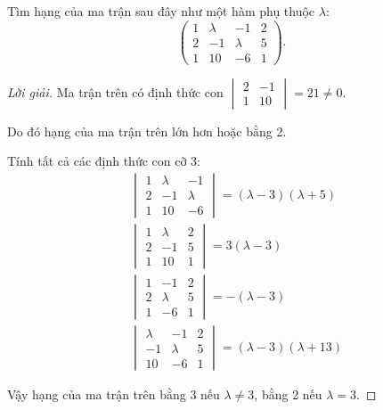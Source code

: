 \documentclass[class=linearalgebra,crop=false]{standalone}
\begin{document}
\begin{exercise}
    \par Tìm hạng của ma trận sau đây như một hàm phụ thuộc $\lambda$:
    \[
        \begin{pmatrix}
            1 & \lambda & -1      & 2 \\
            2 & -1      & \lambda & 5 \\
            1 & 10      & -6      & 1
        \end{pmatrix}.
    \]
\end{exercise}

\begin{proof}[Lời giải]
    \par Ma trận trên có định thức con $\begin{vmatrix}2 & -1 \\ 1 & 10\end{vmatrix} = 21 \ne 0$.
    \par Do đó hạng của ma trận trên lớn hơn hoặc bằng 2.
    \par Tính tất cả các định thức con cỡ 3:
    \begin{align*}
         & \begin{vmatrix}
               1 & \lambda & -1      \\
               2 & -1      & \lambda \\
               1 & 10      & -6
           \end{vmatrix} = (\lambda - 3)(\lambda + 5)  \\
         & \begin{vmatrix}
               1 & \lambda & 2 \\
               2 & -1      & 5 \\
               1 & 10      & 1
           \end{vmatrix} = 3(\lambda - 3)              \\
         & \begin{vmatrix}
               1 & -1      & 2 \\
               2 & \lambda & 5 \\
               1 & -6      & 1
           \end{vmatrix} = -(\lambda - 3)              \\
         & \begin{vmatrix}
               \lambda & -1      & 2 \\
               -1      & \lambda & 5 \\
               10      & -6      & 1
           \end{vmatrix} = (\lambda - 3)(\lambda + 13)
    \end{align*}
    \par Vậy hạng của ma trận trên bằng 3 nếu $\lambda \ne 3$, bằng 2 nếu $\lambda = 3$.
\end{proof}
\end{document}
